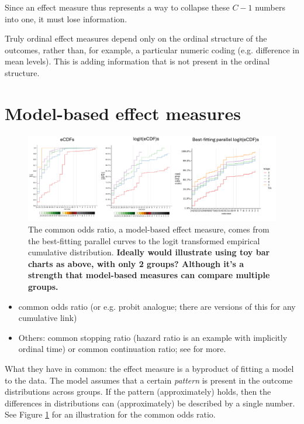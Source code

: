 \documentclass[
  11pt,
  fleqn
]{article}
\begin{document}
Since an effect measure thus represents a way to collapse these $C-1$
numbers into one, it must lose information.

Truly ordinal effect measures depend only on the ordinal structure of
the outcomes, rather than, for example, a particular numeric coding
(e.g. difference in mean levels). This is adding
information that is not present in the ordinal structure.

\section{Model-based effect measures}

\begin{figure}
  \includegraphics[width=7in]{illustrating_common_or.pdf}
  \caption{The common odds ratio, a model-based effect measure, comes
    from the best-fitting parallel curves to the logit transformed
    empirical cumulative distribution. \textbf{Ideally would illustrate
      using toy bar charts as above, with only 2 groups? Although it's a
  strength that model-based measures can compare multiple groups.}}
  \label{fig:illustrating_or}
\end{figure}

\begin{itemize}
  \item
    common odds ratio (or e.g. probit analogue; there are versions of
    this for any cumulative link)
  \item Others: common stopping ratio (hazard ratio is an example
    with implicitly ordinal time) or common continuation
    ratio;
    see
    \citet{burknerOrdinalRegressionModels2019,agrestiAnalysisOrdinalCategorical2010}
    for more.
\end{itemize}

What they have in common: the effect measure is a byproduct of fitting a model
to the data.
The model assumes that a certain \emph{pattern} is present in the outcome
distributions across groups. If the pattern (approximately) holds,
then the differences in
distributions can (approximately) be described by a single number.
See Figure \ref{fig:illustrating_or} for an illustration
for the common odds ratio.
\end{document}

